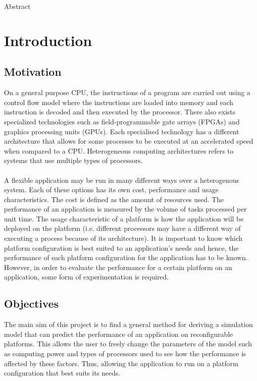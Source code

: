 \documentclass[a4paper,11pt]{article}
\begin{document}
Abstract

\section {Introduction}

\subsection{Motivation}
On a general purpose CPU, the instructions of a program are carried out using a control flow model where the instructions are loaded into memory and each instruction is decoded and then executed by the processor. There also exists specialized technologies such as field-programmable gate arrays (FPGAs) and graphics processing units (GPUs). Each specialised technology has a different architecture that allows for some processes to be executed at an accelerated speed when compared to a CPU. Heterogeneous computing architectures refers to systems that use multiple types of processors\cite{heterogeneous}.
\\\\ 
A flexible application may be run in many different ways over a heterogenous system. Each of these options has its own cost, performance and usage characteristics\cite{harness}. The cost is defined as the amount of resources used. The performance of an application is measured by the volume of tasks processed per unit time. The usage characteristic of a platform is how the application will be deployed on the platform (i.e. different processors may have a different way of executing a process because of its architecture). It is important to know which platform configuration is best suited to an application's needs and hence, the performance of each platform configuration for the application has to be known. However, in order to evaluate the performance for a certain platform on an application, some form of experimentation is required. 

\subsection{Objectives}
The main aim of this project is to find a general method for deriving a simulation model that can predict the performance of an application on reconfigurable platforms. This allows the user to freely change the parameters of the model such as computing power and types of processors used to see how the performance is affected by these factors. Thus, allowing the application to run on a platform configuration that best suits its needs.
\end{document}
